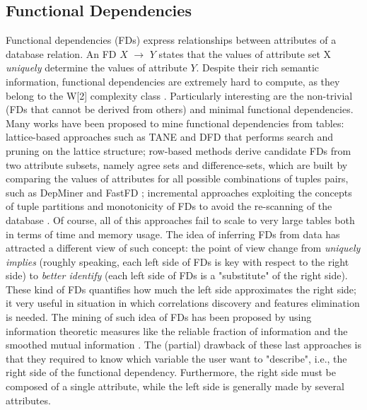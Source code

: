 \subsection{Functional Dependencies}\label{fds}
Functional dependencies (FDs) express relationships between attributes of a database relation. An FD $X$ $\rightarrow$ $Y$ states that the values of attribute set X \textit{uniquely} determine the values of attribute $Y$. Despite their rich semantic information, functional dependencies are extremely hard to compute, as they belong to the W[2] complexity class \cite{blasius2017parameterized}. Particularly interesting are the non-trivial (FDs that cannot be derived from others) and minimal functional dependencies. Many works have been proposed to mine functional dependencies from tables: lattice-based approaches such as TANE \cite{huhtala1999tane} and DFD \cite{abedjan2014dfd} that performs search and pruning on the lattice structure; row-based methods derive candidate FDs from two attribute subsets, namely agree sets and difference-sets, which are built by comparing the values of attributes for all possible combinations of tuples pairs, such as DepMiner \cite{lopes2000efficient} and FastFD \cite{wyss2001fastfds}; incremental approaches exploiting the concepts of tuple partitions and monotonicity of FDs to avoid the re-scanning of the database \cite{wang2001incremental}. Of course, all of this approaches fail to scale to very large tables both in terms of time and memory usage. The idea of inferring FDs from data has attracted a different view of such concept: the point of view change from \textit{uniquely implies} (roughly speaking, each left side of FDs is key with respect to the right side) to \textit{better identify} (each left side of FDs is a "substitute" of the right side). These kind of FDs quantifies how much the left side approximates the right side; it very useful in situation in which correlations discovery and features elimination is needed. The mining of such idea of FDs has been proposed by using information theoretic measures like the reliable fraction of information \cite{mandros2017discovering} and the smoothed mutual information \cite{pennerath2020discovering}. The (partial) drawback of these last approaches is that they required to know which variable the user want to "describe", i.e., the right side of the functional dependency. Furthermore, the right side must be composed of a single attribute, while the left side is generally made by several attributes.

